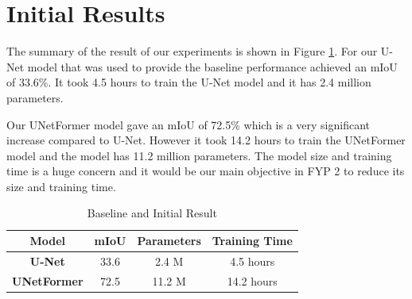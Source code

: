 \FloatBarrier

\section{Initial Results}

The summary of the result of our experiments is shown in Figure \ref{tab:result}. For our U-Net model that was used to provide the baseline performance achieved an mIoU of 33.6\%. It took 4.5 hours to train the U-Net model and it has 2.4 million parameters. 

Our UNetFormer model gave an mIoU of 72.5\% which is a very significant increase compared to U-Net. However it took 14.2 hours to train the UNetFormer model and the model has 11.2 million parameters. The model size and training time is a huge concern and it would be our main objective in FYP 2 to reduce its size and training time. 
\FloatBarrier
\begin{table}[!h]
\centering
\begin{tabular}{|c|c|c|c|}
\hline
\textbf{Model}      & \textbf{mIoU} & \textbf{Parameters} & \textbf{Training Time} \\ \hline
\textbf{U-Net}      & 33.6          & 2.4 M               & 4.5 hours              \\ \hline
\textbf{UNetFormer} & 72.5          & 11.2 M              & 14.2 hours             \\ \hline
\end{tabular}
\caption{Baseline and Initial Result}
\label{tab:result}
\end{table}
\FloatBarrier

